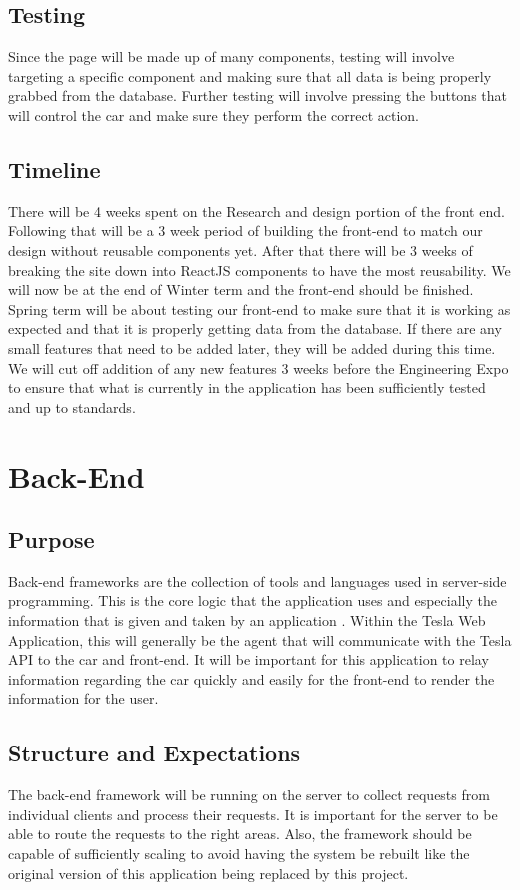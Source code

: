 \documentclass[onecolumn, draftclsnofoot,10pt, compsoc]{IEEEtran}
\begin{document}
    \subsection{Testing}
        Since the page will be made up of many components, testing will involve targeting a specific component and making sure that all data is being properly grabbed from the database. Further testing will involve pressing the buttons that will control the car and make sure they perform the correct action.
    \subsection{Timeline}
        There will be 4 weeks spent on the Research and design portion of the front end.
        Following that will be a 3 week period of building the front-end to match our design without reusable components yet.
        After that there will be 3 weeks of breaking the site down into ReactJS components to have the most reusability.
        We will now be at the end of Winter term and the front-end should be finished.
        Spring term will be about testing our front-end to make sure that it is working as expected and that it is properly getting data from the database.
        If there are any small features that need to be added later, they will be added during this time.
        We will cut off addition of any new features 3 weeks before the Engineering Expo to ensure that what is currently in the application has been sufficiently tested and up to standards.

\section{Back-End}
    \subsection{Purpose}
        Back-end frameworks are the collection of tools and languages used in server-side programming. This is the core logic that the application uses and especially the information that is given and taken by an application \cite{tripathi_2018}. Within the Tesla Web Application, this will generally be the agent that will communicate with the Tesla API to the car and front-end. It will be important for this application to relay information regarding the car quickly and easily for the front-end to render the information for the user. 
    \subsection{Structure and Expectations}
        The back-end framework will be running on the server to collect requests from individual clients and process their requests. It is important for the server to be able to route the requests to the right areas. Also, the framework should be capable of sufficiently scaling to avoid having the system be rebuilt like the original version of this application being replaced by this project.
        
\end{document}
